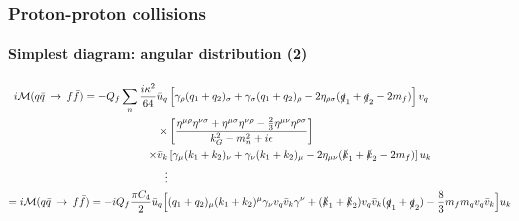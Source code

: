 \documentclass[10pt]{beamer}
\begin{document}
	\begin{frame}
		\frametitle{Proton-proton collisions}
		\framesubtitle{Simplest diagram: angular distribution (2)}
		\tiny
		\begin{align}
			\begin{split}
			i\mathcal{M}(q\bar{q}\:\rightarrow\:f\bar{f}) = -Q_f\sum_{n}\frac{i\kappa^2}{64}\bar{u}_q&\left[\gamma_\rho(q_1 + q_2)_\sigma + \gamma_\sigma(q_1+q_2)_\rho - 2\eta_{\rho\sigma}(\slashed q_1 + \slashed q_2 - 2m_f)\right]v_q\\
			\times&\left[\frac{\eta^{\mu\rho}\eta^{\nu\sigma} + \eta^{\mu\sigma}\eta^{\nu\rho} - \frac{2}{3}\eta^{\mu\nu}\eta^{\rho\sigma}}{k_G^2 - m_n^2 + i\epsilon}\right]\\
			\times\bar{v}_k&\left[\gamma_\mu(k_1 + k_2)_\nu + \gamma_\nu(k_1+k_2)_\mu - 2\eta_{\mu\nu}(\slashed k_1 + \slashed k_2 - 2m_f)\right]u_k\\
			\vdots& \\
			= i\mathcal{M}(q\bar{q}\:\rightarrow\:f\bar{f}) = -iQ_f\frac{\pi C_4}{2}\bar{u}_q\Big[&(q_1 + q_2)_ \mu(k_1+k_2)^\mu \gamma_\nu v_q\bar{v}_k\gamma^\nu + (\slashed k_1 + \slashed k_2)v_q\bar{v}_k(\slashed q_1 + \slashed q_2) - \frac{8}{3}m_fm_qv_q\bar{v}_k\Big]u_k
			\end{split}
		\end{align}
		\normalsize
	\end{frame}
	
\end{document}
